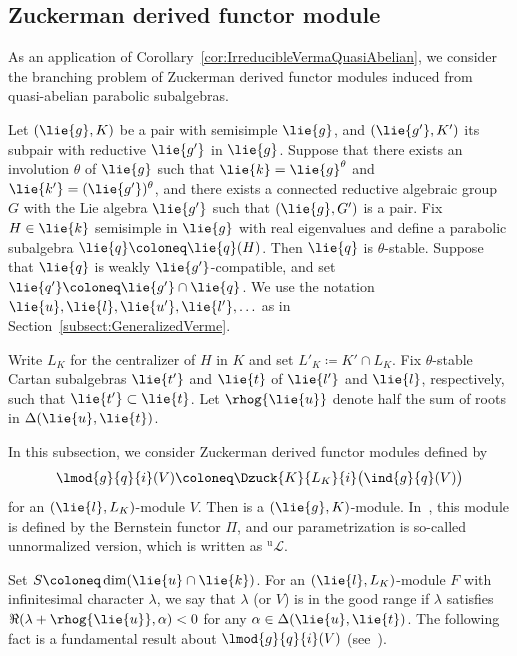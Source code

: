 \subsection{Zuckerman derived functor module}

As an application of Corollary~\ref{cor:IrreducibleVermaQuasiAbelian},
we consider the branching problem of Zuckerman derived functor modules induced from
quasi-abelian parabolic subalgebras.

Let $(\lie{g}, K)$ be a pair with semisimple $\lie{g}$, and $(\lie{g'}, K')$ its subpair with reductive $\lie{g'}$ in $\lie{g}$.
Suppose that there exists an involution $\theta$ of $\lie{g}$ such that $\lie{k} = \lie{g}^\theta$ and $\lie{k'} = (\lie{g'})^\theta$,
and there exists a connected reductive algebraic group $G$ with the Lie algebra $\lie{g'}$ such that $(\lie{g}, G')$ is a pair.
Fix $H \in \lie{k}$ semisimple in $\lie{g}$ with real eigenvalues
and define a parabolic subalgebra $\lie{q}\coloneq \lie{q}(H)$.
Then $\lie{q}$ is $\theta$-stable.
Suppose that $\lie{q}$ is weakly $\lie{g'}$-compatible, and set $\lie{q'}\coloneq \lie{g'}\cap \lie{q}$.
We use the notation $\lie{u}, \lie{l}, \lie{u'}, \lie{l'}, \ldots$ as in Section~\ref{subsect:GeneralizedVerme}.

Write $L_K$ for the centralizer of $H$ in $K$ and set $L'_K\coloneq K'\cap L_K$.
Fix $\theta$-stable Cartan subalgebras $\lie{t'}$ and $\lie{t}$ of $\lie{l'}$ and $\lie{l}$, respectively, such that $\lie{t'}\subset \lie{t}$.
Let $\rhog{\lie{u}}$ denote half the sum of roots in $\Delta(\lie{u}, \lie{t})$.

In this subsection, we consider Zuckerman derived functor modules defined by
\begin{align*}
	\lmod{g}{q}{i}(V)\coloneq \Dzuck{K}{L_K}{i}\bigl(\ind{g}{q}(V)\bigr)
\end{align*}
for an $(\lie{l}, L_K)$-module $V$.
Then  is a $(\lie{g}, K)$-module.
In~\cite{KnVo95_cohomological_induction}, this module is defined by the Bernstein functor $\Pi$,
and our parametrization is so-called unnormalized version, which is written as $\!^{\mathrm{u}}\mathcal{L}$.

Set $S\coloneq \dim(\lie{u}\cap \lie{k})$.
For an $(\lie{l}, L_K)$-module $F$ with infinitesimal character $\lambda$, we say that $\lambda$ (or $V$) is in the good range if $\lambda$ satisfies $\Re(\lambda + \rhog{\lie{u}}, \alpha) < 0$ for any $\alpha \in \Delta(\lie{u}, \lie{t})$.
The following fact is a fundamental result about $\lmod{g}{q}{i}(V)$ (see~\cite[Theorem~0.50]{KnVo95_cohomological_induction}).


